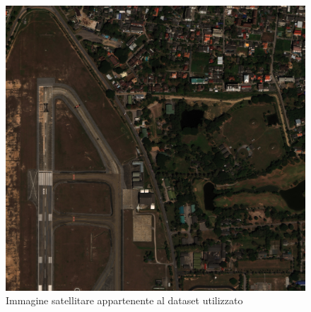 \begin{figure}[H]
	\centering
	\includegraphics[width=0.7\linewidth]{images/immagine-satellite.jpg}
	\caption{Immagine satellitare appartenente al dataset utilizzato}
	\label{Immagine satellitare appartenente al dataset utilizzato}
\end{figure}

